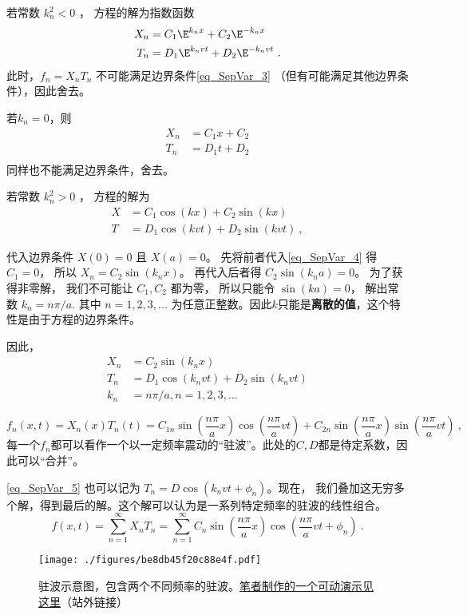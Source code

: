 若常数 $k_n^2 < 0$ ， 方程的解为指数函数
\begin{align}
X_n &= C_1 \E^{k_nx} + C_2 \E^{-k_nx}\\
T_n &= D_1 \E^{k_nvt} + D_2 \E^{-k_nvt}~.
\end{align}
此时，$f_n = X_nT_n$ 不可能满足边界条件\autoref{eq_SepVar_3}  （但有可能满足其他边界条件），因此舍去。

若$k_n=0$，则
\begin{align}
X_n &= C_1x+C_2\\
T_n &= D_1t+D_2\\
\end{align}
同样也不能满足边界条件，舍去。

若常数 $k_n^2 > 0$ ， 方程的解为
\begin{align}\label{eq_SepVar_4}
X &= C_1 \cos(kx) + C_2 \sin(kx)\\
T &= D_1 \cos(kvt) + D_2 \sin(kvt)~,
\end{align}

代入边界条件 $X(0) = 0$ 且 $X(a) = 0$。 先将前者代入\autoref{eq_SepVar_4} 得 $C_1 = 0$， 所以 $X_n = C_2\sin(k_nx)$。 再代入后者得 $C_2\sin(k_na) = 0$。 为了获得非零解， 我们不可能让 $C_1, C_2$ 都为零， 所以只能令 $\sin(ka) = 0$， 解出常数 $k_n = n\pi/a$. 其中 $n=1,2,3,...$ 为任意正整数。因此$k$只能是\textbf{离散的值}，这个特性是由于方程的边界条件。

因此，
\begin{align}
\label{eq_SepVar_5}X_n &= C_2 \sin(k_nx)\\
T_n &= D_1 \cos(k_nvt) + D_2 \sin(k_nvt)\\
k_n & = n\pi/a, n=1,2,3,...
\end{align}

\begin{equation}
f_n(x, t) = X_n(x) T_n(t) = C_{1n} \sin(\frac{n\pi}{a}x)\cos(\frac{n\pi}{a} vt) + C_{2n}\sin(\frac{n\pi}{a}x)\sin(\frac{n\pi}{a}vt)~,
\end{equation}
每一个$f_n$都可以看作一个以一定频率震动的“驻波”。此处的$C, D$都是待定系数，因此可以“合并”。

\autoref{eq_SepVar_5} 也可以记为 $T_n=D\cos(k_nvt+\phi_n)$。现在， 我们叠加这无穷多个解，得到最后的解。这个解可以认为是一系列特定频率的驻波的线性组合。
\begin{equation}
f(x, t) = \sum_{n=1}^\infty X_nT_n = \sum_{n=1}^\infty C_n\sin(\frac{n\pi}{a}x)\cos(\frac{n\pi}{a}vt + \phi_n)~.
\end{equation}

\begin{figure}[ht]
\centering
\texttt{[image: ./figures/be8db45f20c88e4f.pdf]}
\caption{驻波示意图，包含两个不同频率的驻波。\href{https://www.geogebra.org/m/qc7nps6n}{笔者制作的一个可动演示见这里}（站外链接）} \label{fig_SepVar_1}
\end{figure}